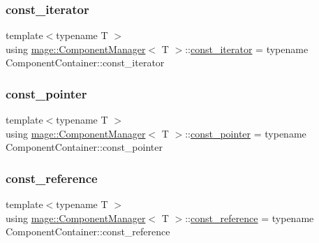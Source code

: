 \subsubsection{\texorpdfstring{const\+\_\+iterator}{const\_iterator}}
{\footnotesize\ttfamily template$<$typename T $>$ \\
using \mbox{\hyperlink{classmage_1_1_component_manager}{mage\+::\+Component\+Manager}}$<$ T $>$\+::\mbox{\hyperlink{classmage_1_1_component_manager_acc0d5ab8de4583ae2dd99c7bc0784c95}{const\+\_\+iterator}} =  typename Component\+Container\+::const\+\_\+iterator}

\mbox{\label{classmage_1_1_component_manager_aca0462fe048337b5453e72cb7facaf31}} 
\subsubsection{\texorpdfstring{const\+\_\+pointer}{const\_pointer}}
{\footnotesize\ttfamily template$<$typename T $>$ \\
using \mbox{\hyperlink{classmage_1_1_component_manager}{mage\+::\+Component\+Manager}}$<$ T $>$\+::\mbox{\hyperlink{classmage_1_1_component_manager_aca0462fe048337b5453e72cb7facaf31}{const\+\_\+pointer}} =  typename Component\+Container\+::const\+\_\+pointer}

\mbox{\label{classmage_1_1_component_manager_ae1b1c864f0dc2cd35c63e1084971b89c}} 
\subsubsection{\texorpdfstring{const\+\_\+reference}{const\_reference}}
{\footnotesize\ttfamily template$<$typename T $>$ \\
using \mbox{\hyperlink{classmage_1_1_component_manager}{mage\+::\+Component\+Manager}}$<$ T $>$\+::\mbox{\hyperlink{classmage_1_1_component_manager_ae1b1c864f0dc2cd35c63e1084971b89c}{const\+\_\+reference}} =  typename Component\+Container\+::const\+\_\+reference}

